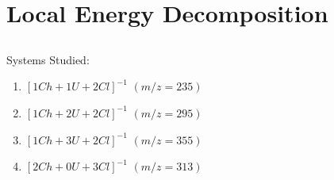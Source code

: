 \section{Local Energy Decomposition}
\subsection{}
Systems Studied:

\begin{enumerate}
    \item $[1Ch+1U+2Cl]^{-1}$ $(m/z = 235)$
    \item $[1Ch+2U+2Cl]^{-1}$ $(m/z = 295)$
    \item $[1Ch+3U+2Cl]^{-1}$ $(m/z = 355)$
    \item $[2Ch+0U+3Cl]^{-1}$ $(m/z = 313)$
\end{enumerate}